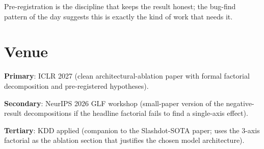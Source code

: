 \documentclass[11pt]{article}
\begin{document}
Pre-registration is the discipline that keeps the result honest;
the bug-find pattern of the day suggests this is exactly the kind
of work that needs it.

\section{Venue}

\textbf{Primary}: ICLR 2027 (clean architectural-ablation paper
with formal factorial decomposition and pre-registered hypotheses).

\textbf{Secondary}: NeurIPS 2026 GLF workshop (small-paper version
of the negative-result decompositions if the headline factorial
fails to find a single-axis effect).

\textbf{Tertiary}: KDD applied (companion to the Slashdot-SOTA
paper; uses the 3-axis factorial as the ablation section that
justifies the chosen model architecture).
\end{document}

